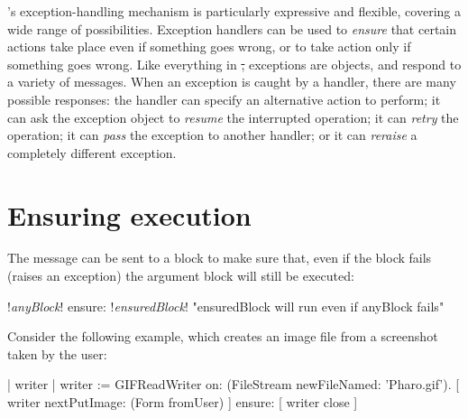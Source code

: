 \pharo's exception-handling mechanism is particularly expressive and flexible, covering a wide range of possibilities. Exception handlers can be used to \emph{ensure} that certain actions take place even if something goes wrong, or to take action only if something goes wrong.
Like everything in \st, exceptions are objects, and respond to a variety of messages.
When an exception is caught by a handler, there are many possible responses: the  handler can specify an alternative action to perform; it can ask the exception object to \emph{resume} the interrupted operation; it can \emph{retry} the operation; it can \emph{pass} the exception to another handler; or it can \emph{reraise} a completely different exception.


\section{Ensuring execution}

The  message can be sent to a block to make sure that, even if the block fails (\eg raises an exception) the argument block will still be executed:
\begin{code}{}
!\emph{anyBlock}! ensure: !\emph{ensuredBlock}!    "ensuredBlock will run even if anyBlock fails"
\end{code}

Consider the following example, which creates an image file from a screenshot taken by the user:



\begin{code}{}
| writer |
writer := GIFReadWriter on: (FileStream newFileNamed: 'Pharo.gif').
[ writer nextPutImage: (Form fromUser) ]
	ensure: [ writer close ]
\end{code}


